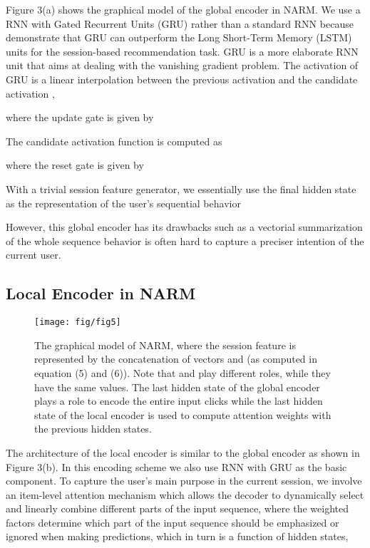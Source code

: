 \documentclass[sigconf]{acmart}
\begin{document}
Figure 3(a) shows the graphical model of the global encoder in NARM. We use a RNN with Gated Recurrent Units (GRU)  rather than a standard RNN because \citet{hidasi2015session} demonstrate that GRU can outperform the Long Short-Term Memory (LSTM) \cite{hochreiter2012long} units for the session-based recommendation task. GRU is a more elaborate RNN unit that aims at dealing with the vanishing gradient problem. The activation of GRU is a linear interpolation between the previous activation  and the candidate activation ,
    
where the update gate  is given by
    
The candidate activation function  is computed as
    
where the reset gate  is given by
    
With a trivial session feature generator, we essentially use the final hidden state  as the representation of the user's sequential behavior
    
  
However, this global encoder has its drawbacks such as a vectorial summarization of the whole sequence behavior is often hard to capture a preciser intention of the current user.
  
\subsection{Local Encoder in NARM}

    \begin{figure*}
       	\centering
       	\texttt{[image: fig/fig5]}
       	\caption{The graphical model of NARM, where the session feature  is represented by the concatenation of vectors  and  (as computed in equation (5) and (6)). Note that  and  play different roles, while they have the same values. The last hidden state of the global encoder  plays a role to encode the entire input clicks while the last hidden state of the local encoder  is used to compute attention weights with the previous hidden states.}
    \end{figure*}

The architecture of the local encoder is similar to the global encoder as shown in Figure 3(b). In this encoding scheme we also use RNN with GRU as the basic component. To capture the user's main purpose in the current session, we involve an item-level attention mechanism which allows the decoder to dynamically select and linearly combine different parts of the input sequence, 
     where the weighted factors  determine which part of the input sequence should be emphasized or ignored when making predictions, which in turn is a function of hidden states, 
     
\end{document}
